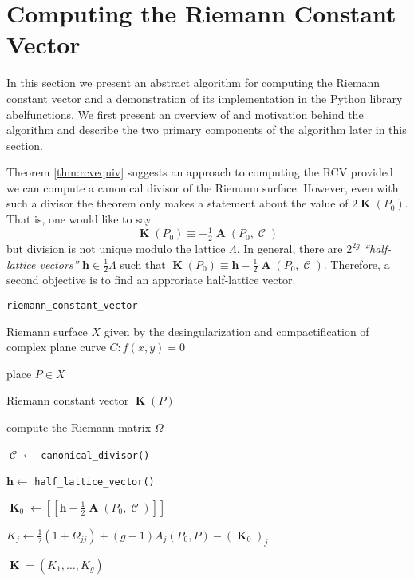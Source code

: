 \documentclass[12pt]{article}
\theoremstyle{definition}
\DeclareMathOperator{\DivC}{\mathcal{C}}
\DeclareMathOperator{\RCV}{\boldsymbol{K}}
\DeclareMathOperator{\Abel}{\boldsymbol{A}}
\begin{document}
\section{Computing the Riemann Constant Vector}





In this section we present an abstract algorithm for computing the
Riemann constant vector and a demonstration of its implementation in the
Python library {\sc abelfunctions}. We first present an overview of and
motivation behind the algorithm and describe the two primary components
of the algorithm later in this section.

Theorem \ref{thm:rcvequiv} suggests an approach to computing the RCV
provided we can compute a canonical divisor of the Riemann
surface. However, even with such a divisor the theorem only makes a
statement about the value of $2\RCV(P_0)$. That is, one would like to
say
\begin{equation}
\RCV(P_0) \equiv - \tfrac{1}{2} \Abel(P_0,\DivC)
\end{equation}
but division is not unique modulo the lattice $\Lambda$. In general,
there are $2^{2g}$ {\it ``half-lattice vectors''} $\boldsymbol{h} \in
\tfrac{1}{2}\Lambda$ such that $\RCV(P_0) \equiv \boldsymbol{h} -
\tfrac{1}{2}\Abel(P_0,\DivC)$. Therefore, a second objective is to find
an approriate half-lattice vector.

\begin{algorithm}[H]
\caption{\tt riemann\_constant\_vector}
\label{alg:rcv}
\begin{algorithmic}[1]
  \Require Riemann surface $X$ given by the desingularization and
  compactification of complex plane curve $C : f(x,y) = 0$

  \Require place $P \in X$

  \Ensure Riemann constant vector $\RCV(P)$

  \State compute the Riemann matrix $\Omega$

  \State $\DivC \gets$ \verb=canonical_divisor()=

  \State $\boldsymbol{h} \gets$ \verb=half_lattice_vector()=

  \State $\RCV_0 \gets \left[ \left[ \boldsymbol{h} -
      \tfrac{1}{2}\Abel(P_0,\DivC) \right] \right]$


      \State $K_j \gets \tfrac{1}{2}(1+\Omega_{jj}) + (g-1)A_j(P_0,P) -
      (\RCV_0)_j$

  \EndFor

  \State \Return $\RCV = (K_1, \ldots, K_g)$
\end{algorithmic}
\end{algorithm}
\end{document}
